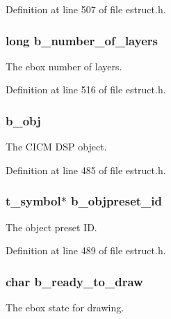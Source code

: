Definition at line 507 of file estruct.\-h.

\hypertarget{struct__edspbox_a84105957ca11a224cf734f350fb23ac9}{
\subsubsection[{b\-\_\-number\-\_\-of\-\_\-layers}]{\setlength{\rightskip}{0pt plus 5cm}long b\-\_\-number\-\_\-of\-\_\-layers}}\label{struct__edspbox_a84105957ca11a224cf734f350fb23ac9}
The ebox number of layers. 

Definition at line 516 of file estruct.\-h.

\hypertarget{struct__edspbox_a384a670299e98768527fbe457de9a38a}{
\subsubsection[{b\-\_\-obj}]{ b\-\_\-obj}}\label{struct__edspbox_a384a670299e98768527fbe457de9a38a}
The C\-I\-C\-M D\-S\-P object. 

Definition at line 485 of file estruct.\-h.

\hypertarget{struct__edspbox_adc377263d208d1051f4a0997868b1155}{
\subsubsection[{b\-\_\-objpreset\-\_\-id}]{\setlength{\rightskip}{0pt plus 5cm}t\-\_\-symbol$\ast$ b\-\_\-objpreset\-\_\-id}}\label{struct__edspbox_adc377263d208d1051f4a0997868b1155}
The object preset I\-D. 

Definition at line 489 of file estruct.\-h.

\hypertarget{struct__edspbox_a234ea03e103bd45f5fa1d27b8e69b5dd}{
\subsubsection[{b\-\_\-ready\-\_\-to\-\_\-draw}]{\setlength{\rightskip}{0pt plus 5cm}char b\-\_\-ready\-\_\-to\-\_\-draw}}\label{struct__edspbox_a234ea03e103bd45f5fa1d27b8e69b5dd}
The ebox state for drawing. 

